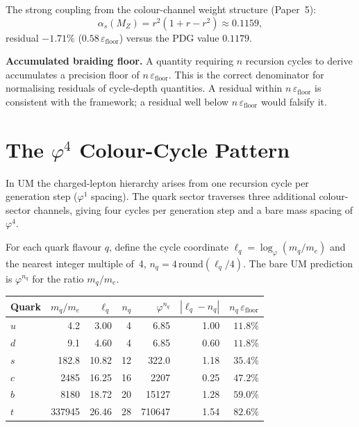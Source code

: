 \documentclass[12pt]{article}
\begin{document}
The strong coupling from the colour-channel weight structure (Paper~5):
\begin{equation}
  \alpha_s(M_Z) = r^2(1+r-r^2) \approx 0.1159,
  \label{eq:as}
\end{equation}
residual $-1.71\%$ ($0.58\,\varepsilon_{\text{floor}}$) versus the PDG value
$0.1179$.

\textbf{Accumulated braiding floor.} A quantity requiring $n$ recursion cycles
to derive accumulates a precision floor of $n\,\varepsilon_{\text{floor}}$.
This is the correct denominator for normalising residuals of cycle-depth
quantities. A residual within $n\,\varepsilon_{\text{floor}}$ is consistent
with the framework; a residual well below $n\,\varepsilon_{\text{floor}}$ would
falsify it.

\section{The $\varphi^4$ Colour-Cycle Pattern}

In UM the charged-lepton hierarchy arises from one recursion cycle per
generation step ($\varphi^1$ spacing). The quark sector traverses three
additional colour-sector channels, giving four cycles per generation step
and a bare mass spacing of $\varphi^4$.

For each quark flavour $q$, define the cycle coordinate
$\ell_q = \log_\varphi(m_q/m_e)$ and the nearest integer multiple of~4,
$n_q = 4\,\text{round}(\ell_q/4)$. The bare UM prediction is
$\varphi^{n_q}$ for the ratio $m_q/m_e$.

\begin{center}
\begin{tabular}{lrrrrrr}
\toprule
Quark & $m_q/m_e$ & $\ell_q$ & $n_q$ &
  $\varphi^{n_q}$ & $|\ell_q - n_q|$ & $n_q\,\varepsilon_\text{floor}$ \\
\midrule
$u$ & 4.2  & 3.00 & 4  & 6.85   & 1.00 & $11.8\%$ \\
$d$ & 9.1  & 4.60 & 4  & 6.85   & 0.60 & $11.8\%$ \\
$s$ & 182.8 & 10.82 & 12 & 322.0 & 1.18 & $35.4\%$ \\
$c$ & 2485 & 16.25 & 16 & 2207  & 0.25 & $47.2\%$ \\
$b$ & 8180 & 18.72 & 20 & 15127 & 1.28 & $59.0\%$ \\
$t$ & 337945 & 26.46 & 28 & 710647 & 1.54 & $82.6\%$ \\
\bottomrule
\end{tabular}
\end{center}
\end{document}
